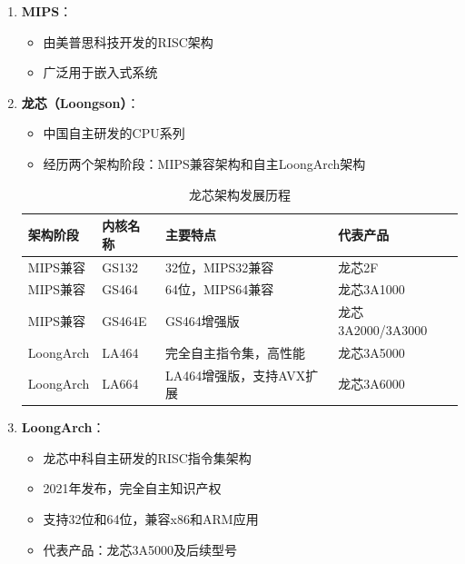 \documentclass[12pt,UTF8]{ctexbook}
\begin{document}
\begin{enumerate}
    \item \textbf{MIPS}：
    \begin{itemize}[leftmargin=2em]
        \item 由美普思科技开发的RISC架构
        \item 广泛用于嵌入式系统
    \end{itemize}
    
    \item \textbf{龙芯（Loongson）}：
    \begin{itemize}[leftmargin=2em]
        \item 中国自主研发的CPU系列
        \item 经历两个架构阶段：MIPS兼容架构和自主LoongArch架构
    \end{itemize}
    
    \begin{table}[H]
        \centering
        \begin{tabular}{|p{2cm}|p{3cm}|p{6cm}|p{3cm}|}
            \hline
            \textbf{架构阶段} & \textbf{内核名称} & \textbf{主要特点} & \textbf{代表产品} \\
            \hline
            MIPS兼容 & GS132 & 32位，MIPS32兼容 & 龙芯2F \\
            \hline
            MIPS兼容 & GS464 & 64位，MIPS64兼容 & 龙芯3A1000 \\
            \hline
            MIPS兼容 & GS464E & GS464增强版 & 龙芯3A2000/3A3000 \\
            \hline
            LoongArch & LA464 & 完全自主指令集，高性能 & 龙芯3A5000 \\
            \hline
            LoongArch & LA664 & LA464增强版，支持AVX扩展 & 龙芯3A6000 \\
            \hline
        \end{tabular}
        \caption{龙芯架构发展历程}
        \label{tab:loongson_architecture}
    \end{table}
    
    \item \textbf{LoongArch}：
    \begin{itemize}[leftmargin=2em]
        \item 龙芯中科自主研发的RISC指令集架构
        \item 2021年发布，完全自主知识产权
        \item 支持32位和64位，兼容x86和ARM应用
        \item 代表产品：龙芯3A5000及后续型号
    \end{itemize}
    

\end{enumerate}
\end{document}
